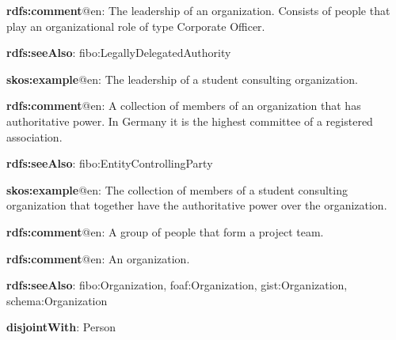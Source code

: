 \documentclass[a4paper, DIV=13, BCOR=0cm]{scrbook}
\begin{document}
\begin{mdframed}[style=onto-2, frametitle={Executive Board}]
	{%
		\begin{compactitem}
			\item \textbf{rdfs:comment}@en: The leadership of an organization. Consists of people that play an organizational role of type Corporate Officer.
			\item \textbf{rdfs:seeAlso}: fibo:LegallyDelegatedAuthority
			\item \textbf{skos:example}@en: The leadership of a student consulting organization.
		\end{compactitem}
	} %
\end{mdframed}

\begin{mdframed}[style=onto-2, frametitle={Member Assembly}]
	{%
		\begin{compactitem}
			\item \textbf{rdfs:comment}@en: A collection of members of an organization that has authoritative power. In Germany it is the highest committee of a registered association.
			\item \textbf{rdfs:seeAlso}: fibo:EntityControllingParty
			\item \textbf{skos:example}@en: The collection of members of a student consulting organization that together have the authoritative power over the organization.
		\end{compactitem}
	} %
\end{mdframed}

\begin{mdframed}[style=onto-2, frametitle={Project Team}]
	{%
		\begin{compactitem}
			\item \textbf{rdfs:comment}@en: A group of people that form a project team.
		\end{compactitem}
	} %
\end{mdframed}

\begin{mdframed}[style=onto-1, frametitle={Organization}]
	{%
		\begin{compactitem}
			\item \textbf{rdfs:comment}@en: An organization.
			\item \textbf{rdfs:seeAlso}: fibo:Organization, foaf:Organization, 
			gist:Organization, \\ schema:Organization
			\item \textbf{disjointWith}: Person
		\end{compactitem}
	} %
\end{mdframed}
\end{document}
